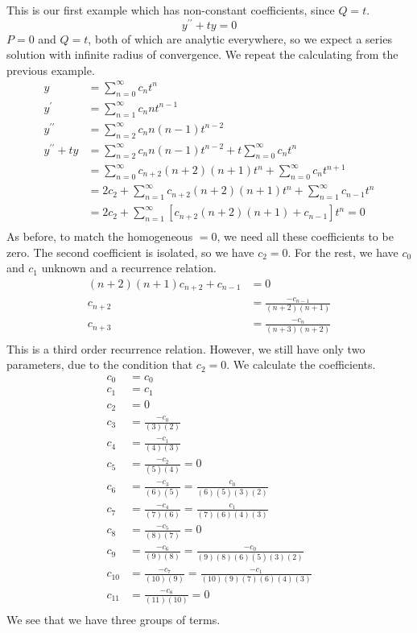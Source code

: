 \documentclass[fleqn,letterpaper]{report}
\begin{document}
\begin{example}
This is our first example which has non-constant
coefficients, since $Q = t$. 
\begin{equation*}
y^{\prime \prime} + ty = 0
\end{equation*}
$P=0$ and $Q=t$, both of which are analytic everywhere,
so we expect a series solution with infinite radius of
convergence. We repeat the calculating from the previous
example.
\begin{align*}
y & = \sum_{n=0}^\infty c_n t^n \\
y^\prime & = \sum_{n=1}^\infty c_n nt^{n-1} \\
y^{\prime\prime} & = \sum_{n=2}^\infty c_n n(n-1)t^{n-2} \\
y^{\prime \prime} + ty & = \sum_{n=2}^\infty c_n n(n-1)t^{n-2} +
t\sum_{n=0}^\infty c_n t^n \\
& = \sum_{n=0}^\infty c_{n+2} (n+2)(n+1) t^n +
\sum_{n=0}^\infty c_n t^{n+1} \\
& = 2c_2 + \sum_{n=1}^\infty c_{n+2} (n+2)(n+1) t^n +
\sum_{n=1}^\infty c_{n-1} t^n \\
& = 2c_2 + \sum_{n=1}^\infty \left[ c_{n+2} (n+2)(n+1) + c_{n-1}
\right] t^n = 0 \\
\end{align*}
As before, to match the homogeneous $=0$, we need all these
coefficients to be zero. The second coefficient is isolated,
so we have $c_2=0$. For the rest, we have $c_0$ and $c_1$
unknown and a recurrence relation.
\begin{align*}
(n+2)(n+1)c_{n+2} + c_{n-1} & = 0 \\
c_{n+2} & = \frac{-c_{n-1}}{(n+2)(n+1)} \\
c_{n+3} & = \frac{-c_n}{(n+3)(n+2)} \\
\end{align*}
This is a third order recurrence relation. However,
we still have only two parameters, due to the condition that
$c_2=0$. We calculate the coefficients.
\begin{align*}
c_0 & = c_0 \\
c_1 & = c_1 \\
c_2 & = 0 \\
c_3 & = \frac{-c_0}{(3)(2)} \\
c_4 & = \frac{-c_1}{(4)(3)} \\
c_5 & = \frac{-c_2}{(5)(4)} = 0 \\
c_6 & = \frac{-c_3}{(6)(5)} = \frac{c_0}{(6)(5)(3)(2)} \\
c_7 & = \frac{-c_4}{(7)(6)} = \frac{c_1}{(7)(6)(4)(3)} \\
c_8 & = \frac{-c_5}{(8)(7)} = 0 \\
c_9 & = \frac{-c_6}{(9)(8)} = \frac{-c_0}{(9)(8)(6)(5)(3)(2)} \\
c_{10} & = \frac{-c_7}{(10)(9)} = \frac{-c_1}{(10)(9)(7)(6)(4)(3)} \\
c_{11} & = \frac{-c_8}{(11)(10)} = 0 \\
\end{align*}
We see that we have three groups of terms. 


\end{example}
\end{document}
